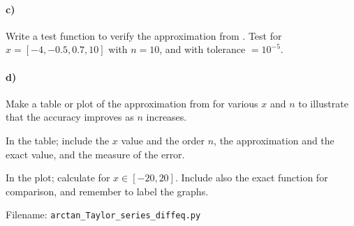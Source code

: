 \begin{Problem}
\paragraph{c)}
Write a test function to verify the approximation from . Test for $x=[-4, -0.5, 0.7, 10]$ with $n=10$, and with tolerance $=10^{-5}$.

\paragraph{d)}
Make a table or plot of the approximation from  for various $x$ and $n$ to illustrate that the accuracy improves as $n$ increases.


In the table; include the $x$ value and the order $n$, the approximation and the exact value, and the measure of the error.


In the plot; calculate for $x\in[-20, 20]$. Include also the exact function for comparison, and remember to label the graphs.



Filename: \texttt{arctan\_Taylor\_series\_diffeq.py}
\end{Problem}
